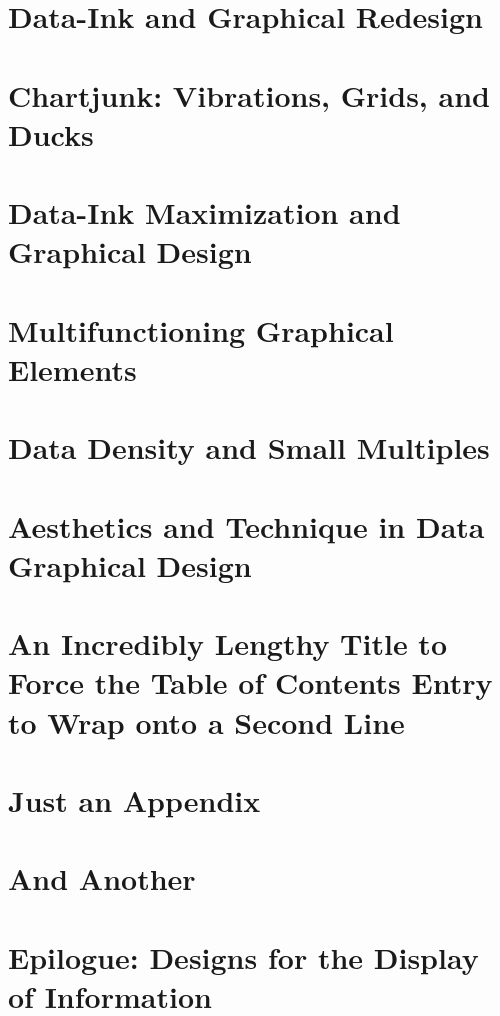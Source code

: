 \documentclass{bayeshyp}
\begin{document}
\chapter{Data-Ink and Graphical Redesign}
\setcounter{page}{91}

\chapter{Chartjunk: Vibrations, Grids, and Ducks}
\setcounter{page}{107}

\chapter{Data-Ink Maximization and Graphical Design}
\setcounter{page}{123}

\chapter{Multifunctioning Graphical Elements}
\setcounter{page}{139}

\chapter{Data Density and Small Multiples}
\setcounter{page}{161}

\chapter{Aesthetics and Technique in Data Graphical Design}
\setcounter{page}{177}

\chapter{An Incredibly Lengthy Title to Force the Table of Contents Entry to Wrap onto a Second Line}
\setcounter{page}{181}

\appendix

\chapter{Just an Appendix}
\setcounter{page}{183}

\chapter{And Another}
\setcounter{page}{185}

\backmatter
\chapter{Epilogue: Designs for the Display of Information}
\setcounter{page}{191}
\end{document}
